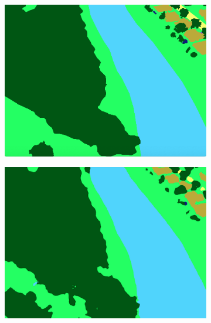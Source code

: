 \begin{figure}[h!]
\begin{subfigure}[b]{0.45\textwidth}
         \includegraphics[width=\textwidth]{img/3_1.png}
         \caption{}
         \label{}
     \end{subfigure}
     \hfill
     \begin{subfigure}[b]{0.45\textwidth}
         \centering
         \includegraphics[width=\textwidth]{img/3_2.png}
         \caption{}
         \label{fig:three sin x}
     \end{subfigure}
     \hfill
     \begin{subfigure}[b]{0.45\textwidth}
         \centering

\end{subfigure}
\end{figure}
